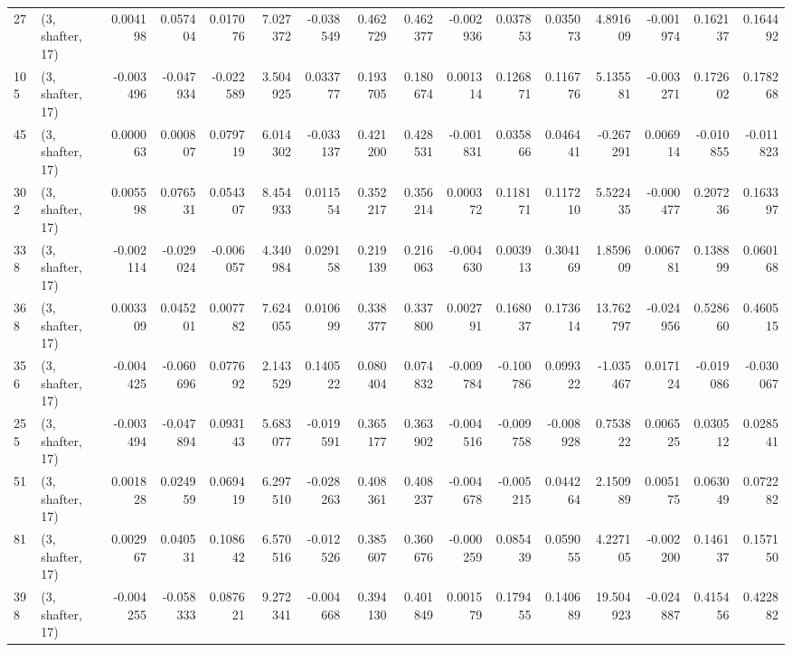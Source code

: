 \begin{tabular}{llrrrrrrrrrrrrrr}
27  &  (3, shafter, 17) &   0.004198 &  0.057404 &  0.017076 &    7.027372 & -0.038549 &   0.462729 &  0.462377 & -0.002936 &  0.037853 &  0.035073 &    4.891609 & -0.001974 &  0.162137 &  0.164492 \\
105 &  (3, shafter, 17) &  -0.003496 & -0.047934 & -0.022589 &    3.504925 &  0.033777 &   0.193705 &  0.180674 &  0.001314 &  0.126871 &  0.116776 &    5.135581 & -0.003271 &  0.172602 &  0.178268 \\
45  &  (3, shafter, 17) &   0.000063 &  0.000807 &  0.079719 &    6.014302 & -0.033137 &   0.421200 &  0.428531 & -0.001831 &  0.035866 &  0.046441 &   -0.267291 &  0.006914 & -0.010855 & -0.011823 \\
302 &  (3, shafter, 17) &   0.005598 &  0.076531 &  0.054307 &    8.454933 &  0.011554 &   0.352217 &  0.356214 &  0.000372 &  0.118171 &  0.117210 &    5.522435 & -0.000477 &  0.207236 &  0.163397 \\
338 &  (3, shafter, 17) &  -0.002114 & -0.029024 & -0.006057 &    4.340984 &  0.029158 &   0.219139 &  0.216063 & -0.004630 &  0.003913 &  0.304169 &    1.859609 &  0.006781 &  0.138899 &  0.060168 \\
368 &  (3, shafter, 17) &   0.003309 &  0.045201 &  0.007782 &    7.624055 &  0.010699 &   0.338377 &  0.337800 &  0.002791 &  0.168037 &  0.173614 &   13.762797 & -0.024956 &  0.528660 &  0.460515 \\
356 &  (3, shafter, 17) &  -0.004425 & -0.060696 &  0.077692 &    2.143529 &  0.140522 &   0.080404 &  0.074832 & -0.009784 & -0.100786 &  0.099322 &   -1.035467 &  0.017124 & -0.019086 & -0.030067 \\
255 &  (3, shafter, 17) &  -0.003494 & -0.047894 &  0.093143 &    5.683077 & -0.019591 &   0.365177 &  0.363902 & -0.004516 & -0.009758 & -0.008928 &    0.753822 &  0.006525 &  0.030512 &  0.028541 \\
51  &  (3, shafter, 17) &   0.001828 &  0.024959 &  0.069419 &    6.297510 & -0.028263 &   0.408361 &  0.408237 & -0.004678 & -0.005215 &  0.044264 &    2.150989 &  0.005175 &  0.063049 &  0.072282 \\
81  &  (3, shafter, 17) &   0.002967 &  0.040531 &  0.108642 &    6.570516 & -0.012526 &   0.385607 &  0.360676 & -0.000259 &  0.085439 &  0.059055 &    4.227105 & -0.002200 &  0.146137 &  0.157150 \\
398 &  (3, shafter, 17) &  -0.004255 & -0.058333 &  0.087621 &    9.272341 & -0.004668 &   0.394130 &  0.401849 &  0.001579 &  0.179455 &  0.140689 &   19.504923 & -0.024887 &  0.415456 &  0.422882 \\

\end{tabular}
